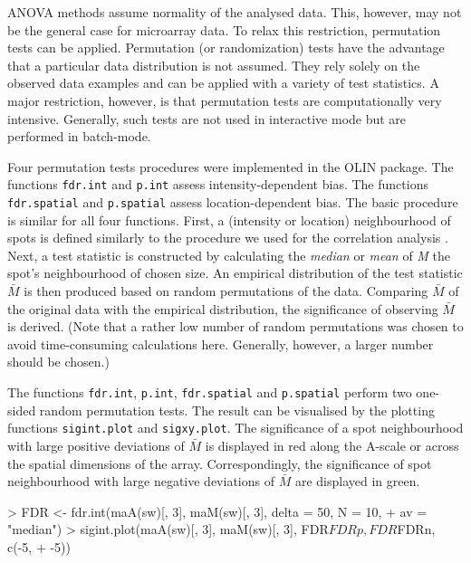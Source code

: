 \documentclass[a4paper,11pt]{article}
\begin{document}
ANOVA methods assume normality of the analysed data. This, however, may not be the
general case for microarray data. To relax this restriction, permutation tests can be
applied. Permutation (or randomization) tests have the advantage that a particular data 
distribution is not assumed. They rely solely on the observed data examples and can be 
applied with a variety of test statistics. A major restriction, however, is that 
permutation tests are computationally very intensive.
Generally, such tests are not used in interactive mode but are performed in batch-mode. 


Four permutation tests procedures were implemented in the OLIN package. 
The functions \texttt{fdr.int}  and \texttt{p.int} assess intensity-dependent
bias. The functions \texttt{fdr.spatial} and \texttt{p.spatial} assess location-dependent
bias. The basic procedure is similar for all four functions.
First, a (intensity or location)  neighbourhood of spots is defined similarly to the procedure
we used for the correlation analysis .  Next, a test statistic is constructed by calculating
 the \emph{median} or \emph{mean} of \emph{M} the  spot's  neighbourhood of chosen size.
 An empirical distribution of the test statistic $\bar{M}$ is 
then produced  based on random permutations of the
data. Comparing  $\bar{M}$ of the original data with the empirical distribution, the significance 
of observing  $\bar{M}$ is derived. (Note that a rather low number of random permutations was chosen
to avoid time-consuming calculations here. Generally, however, a larger number should be chosen.)  


The functions \texttt{fdr.int}, \texttt{p.int}, \texttt{fdr.spatial} and  \texttt{p.spatial}
perform two one-sided random permutation tests. The result can be visualised by 
the plotting functions \texttt{sigint.plot} and \texttt{sigxy.plot}. 
The significance of a spot neighbourhood with large positive deviations of $\bar{M}$ is 
displayed in red along the A-scale or across the spatial dimensions of the array. 
Correspondingly, the significance of spot neighbourhood with large negative 
deviations of  $\bar{M}$ are displayed in green.  


\begin{Schunk}
\begin{Sinput}
> FDR <- fdr.int(maA(sw)[, 3], maM(sw)[, 3], delta = 50, N = 10, 
+     av = "median")
> sigint.plot(maA(sw)[, 3], maM(sw)[, 3], FDR$FDRp, FDR$FDRn, c(-5, 
+     -5))
\end{Sinput}
\end{Schunk}
\end{document}
